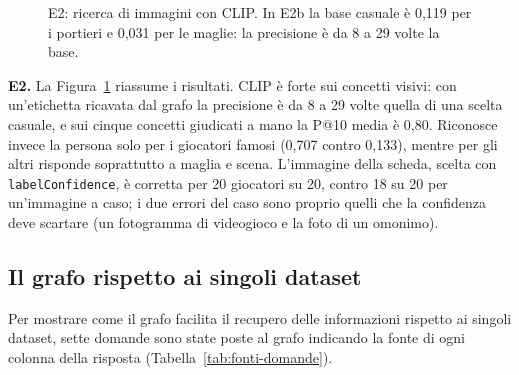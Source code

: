 \documentclass[11pt,a4paper]{article}
\newcommand{\code}[1]{\texttt{\small #1}}
\begin{document}
\begin{figure}[t]
\centering
{}
\caption{E2: ricerca di immagini con CLIP. In E2b la base casuale è 0,119 per i portieri e 0,031 per le maglie: la precisione è da 8 a 29 volte la base.}
\label{fig:e2}
\end{figure}

\textbf{E2.} La Figura~\ref{fig:e2} riassume i risultati. CLIP è forte sui concetti visivi: con un'etichetta ricavata dal grafo la precisione è da 8 a 29 volte quella di una scelta casuale, e sui cinque concetti giudicati a mano la P@10 media è 0,80. Riconosce invece la persona solo per i giocatori famosi (0,707 contro 0,133), mentre per gli altri risponde soprattutto a maglia e scena. L'immagine della scheda, scelta con \code{labelConfidence}, è corretta per 20 giocatori su 20, contro 18 su 20 per un'immagine a caso; i due errori del caso sono proprio quelli che la confidenza deve scartare (un fotogramma di videogioco e la foto di un omonimo).

\subsection{Il grafo rispetto ai singoli dataset}
Per mostrare come il grafo facilita il recupero delle informazioni rispetto ai singoli dataset, sette domande sono state poste al grafo indicando la fonte di ogni colonna della risposta (Tabella~\ref{tab:fonti-domande}).
\end{document}
